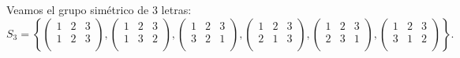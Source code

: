 \documentclass[12pt,a4paper]{book}
\newcommand{\llavesgrandes}[1]{\left\{#1\right\}}
\begin{document}
    \begin{ejemplo}
    \label{ej:42}
        Veamos el grupo simétrico de 3 letras:
        \begin{equation*}
        S_{3} = \llavesgrandes{\begin{pmatrix}
            1 & 2 & 3 \\
            1 & 2 & 3 \\
        \end{pmatrix}, \begin{pmatrix}
            1 & 2 & 3 \\
            1 & 3 & 2 \\
        \end{pmatrix}, \begin{pmatrix}
            1 & 2 & 3 \\
            3 & 2 & 1 \\
        \end{pmatrix}, \begin{pmatrix}
            1 & 2 & 3 \\
            2 & 1 & 3 \\
        \end{pmatrix}, \begin{pmatrix}
            1 & 2 & 3 \\
            2 & 3 & 1 \\
        \end{pmatrix}, \begin{pmatrix}
            1 & 2 & 3 \\
            3 & 1 & 2 \\
        \end{pmatrix}
        }.
        \end{equation*}
    \end{ejemplo}
\end{document}
